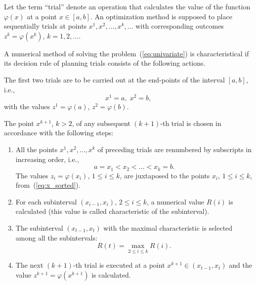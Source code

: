 \documentclass[preprint]{elsarticle}
\begin{document}
Let the term \enquote{trial} denote an operation that calculates the value of the function $\varphi(x)$ at a point $x \in [a, b]$. An optimization method is supposed to place sequentially trials at points $x^1, x^2, \dots, x^k, \dots $ with corresponding outcomes $z^k = \varphi(x^k)$, $k = 1, 2, \dots$.

A numerical method of solving the problem~(\ref{eq:univariate}) is characteristical if its decision rule of planning trials consists of the following actions.

The first two trials are to be carried out at the end-points of the interval $[a, b]$, i.e.,
\begin{equation}
  x^1 = a, \; x^2 = b,
\end{equation}
with the values $z^1 = \varphi(a)$, $z^2 = \varphi(b)$.

The point $x^{k + 1}$, $k > 2$, of any subsequent $(k + 1)$-th trial is chosen in accordance with the following steps:
\begin{enumerate}[Step 1.]
  \setlength\itemsep{0.5em}

  \item All the points $x^1, x^2, \dots, x^k$ of preceding trials are renumbered by subscripts in increasing order, i.e.,
  \begin{equation}
    \label{eq:x_sorted}
    a = x_1 < x_2 < \dots < x_k = b.
  \end{equation}
  The values $z_i = \varphi(x_i)$, $1 \leq i \leq k$, are juxtaposed to the points $x_i$, $1 \leq i \leq k$, from~(\ref{eq:x_sorted}).

  \item For each subinterval $(x_{i - 1}, x_i)$, $2 \leq i \leq k$, a numerical value $R(i)$ is calculated (this value is called characteristic of the subinterval).

  \item The subinterval $(x_{t - 1}, x_t)$ with the maximal characteristic is selected among all the subintervals:
  \begin{equation}
    \label{eq:r_max}
    R(t) = \max_{2 \leq i \leq k} R(i).
  \end{equation}

  \item The next $(k + 1)$-th trial is executed at a point $x^{k + 1} \in (x_{t - 1}, x_t)$ and the value $z^{k + 1} = \varphi(x^{k + 1})$ is calculated.
\end{enumerate}
\end{document}
